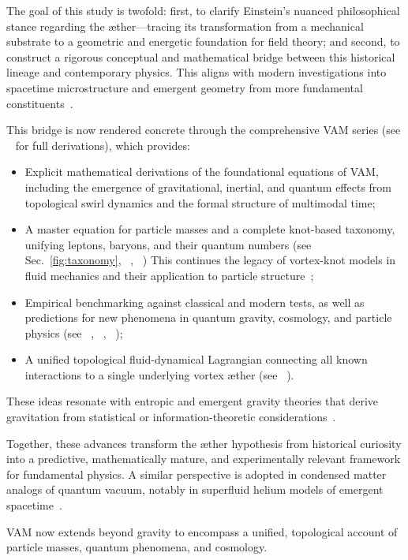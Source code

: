 The goal of this study is twofold: first, to clarify Einstein’s nuanced philosophical stance regarding the æther—tracing its transformation from a mechanical substrate to a geometric and energetic foundation for field theory; and second, to construct a rigorous conceptual and mathematical bridge between this historical lineage and contemporary physics. This aligns with modern investigations into spacetime microstructure and emergent geometry from more fundamental constituents~\cite{hossenfelder2018lost}.


This bridge is now rendered concrete through the comprehensive VAM series (see ~\cite{VAM-8} for full derivations), which provides:

\begin{itemize}
    \item Explicit mathematical derivations of the foundational equations of VAM, including the emergence of gravitational, inertial, and quantum effects from topological swirl dynamics and the formal structure of multimodal time;
    \item A master equation for particle masses and a complete knot-based taxonomy, unifying leptons, baryons, and their quantum numbers (see Sec.~\ref{fig:taxonomy}, ~\cite{VAM-8}, ~\cite{VAM-11}) This continues the legacy of vortex-knot models in fluid mechanics and their application to particle structure~\cite{knot_theroy_in_fluid};
    \item Empirical benchmarking against classical and modern tests, as well as predictions for new phenomena in quantum gravity, cosmology, and particle physics (see ~\cite{VAM-8}, ~\cite{VAM-12}, ~\cite{VAM-15});
    \item A unified topological fluid-dynamical Lagrangian connecting all known interactions to a single underlying vortex æther (see ~\cite{VAM-14}).
\end{itemize}

These ideas resonate with entropic and emergent gravity theories that derive gravitation from statistical or information-theoretic considerations~\cite{Verlinde2011}.

Together, these advances transform the æther hypothesis from historical curiosity into a predictive, mathematically mature, and experimentally relevant framework for fundamental physics. A similar perspective is adopted in condensed matter analogs of quantum vacuum, notably in superfluid helium models of emergent spacetime~\cite{volovik2003universe}.


VAM now extends beyond gravity to encompass a unified, topological account of particle masses, quantum phenomena, and cosmology.

